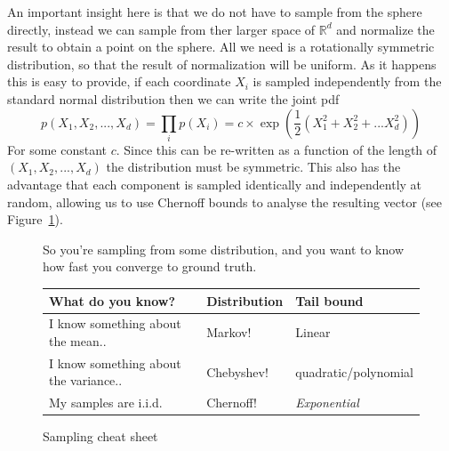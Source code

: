 \documentclass[11pt]{article}
\newcommand{\R}{\mathbb{R}}
\begin{document}
An important insight here is that we do not have to sample from the sphere directly, instead we can sample from ther larger space of $\R^d$ and normalize the result to obtain a point on the sphere. All we need is a rotationally symmetric distribution, so that the result of normalization will be uniform. As it happens this is easy to provide, if each coordinate $X_i$ is sampled independently from the standard normal distribution then we can write the joint pdf
\[ p(X_1,X_2,...,X_d) = \prod_{i} p(X_i) = c \times \exp(\frac{1}{2} (X_1^2 + X_2^2 + ... X_d^2)) \]
For some constant $c$. Since this can be re-written as a function of the length of $(X_1,X_2,...,X_d)$ the distribution must be symmetric. This also has the advantage that each component is sampled identically and independently at random, allowing us to use Chernoff bounds to analyse the resulting vector (see Figure~\ref{fig:bounds}).

    \begin{figure}[H]
      So you're sampling from some distribution, and you want to know how fast
      you converge to ground truth.

      \begin{tabular}{lll}
        What do you know? & Distribution & Tail bound\\
        \hline
        I know something about the mean..  & Markov! & Linear \\
        I know something about the variance..  & Chebyshev! & quadratic/polynomial\\
        My samples are i.i.d.  & Chernoff! & \emph{Exponential}\\
        \hline
      \end{tabular}
      \caption{Sampling cheat sheet}
      \label{fig:bounds}
    \end{figure}


{}

\end{document}
